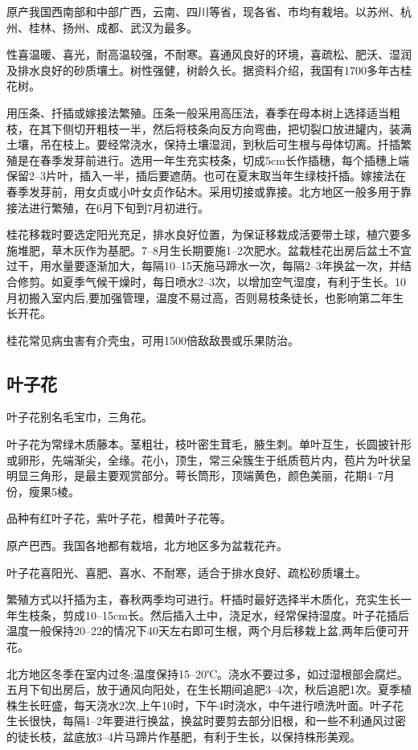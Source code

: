 \documentclass{ctexbook}
\begin{document}
原产我国西南部和中部广西，云南、四川等省，现各省、市均有栽培。以苏州、杭州、桂林、扬州、成都、武汉为最多。

性喜温暖、喜光，耐高温较强，不耐寒。喜通风良好的环境，喜疏松、肥沃、湿润及排水良好的砂质壤土。树性强健，树龄久长。据资料介绍，我国有1700多年古桂花树。

用压条、扦插或嫁接法繁殖。压条一般采用高压法，春季在母本树上选择适当粗枝，在其下侧切开粗枝一半，然后将枝条向反方向弯曲，把切裂口放进罐内，装满土壤，吊在枝上。要经常浇水，保持土壤湿润，到秋后可生根与母体切离。扦插繁殖是在春季发芽前进行。选用一年生充实枝条，切成5cm长作插穗，每个插穗上端保留2--3片叶，插入一半，插后要遮荫。也可在夏末取当年生绿枝扦插。嫁接法在春季发芽前，用女贞或小叶女贞作砧木。采用切接或靠接。北方地区一般多用于靠接法进行繁殖，在6月下旬到7月初进行。

桂花移栽时要选定阳光充足，排水良好位置，为保证移栽成活要带土球，植穴要多施堆肥，草木灰作为基肥。7--8月生长期要施1--2次肥水。盆栽桂花出房后盆土不宜过干，用水量要逐渐加大，每隔10--15天施马蹄水一次，每隔2--3年换盆一次，并结合修剪。如夏季气候干燥时，每日喷水2--3次，以增加空气湿度，有利于生长。10月初搬入室内后,要加强管理，温度不易过高，否则易枝条徒长，也影响第二年生长开花。

桂花常见病虫害有介壳虫，可用1500倍敌敌畏或乐果防治。
\subsection{叶子花}
叶子花别名毛宝巾，三角花。

叶子花为常绿木质藤本。茎粗壮，枝叶密生茸毛，腋生刺。单叶互生，长圆披针形或卵形，先端渐尖，全缘。花小，顶生，常三朵簇生于纸质苞片内，苞片为叶状呈明显三角形，是最主要观赏部分。萼长筒形，顶端黄色，颜色美丽，花期4--7月份，瘦果5棱。

品种有红叶子花，紫叶子花，橙黄叶子花等。

原产巴西。我国各地都有栽培，北方地区多为盆栽花卉。

叶子花喜阳光、喜肥、喜水、不耐寒，适合于排水良好、疏松砂质壤土。

繁殖方式以扦插为主，春秋两季均可进行。杆插时最好选择半木质化，充实生长一年生枝条，剪成10--15cm长。然后插入土中，浇足水，经常保持湿度。叶子花插后温度一般保持20--22的情况下40天左右即可生根，两个月后移栽上盆,两年后便可开花。

北方地区冬季在室内过冬;温度保持15--20℃。浇水不要过多，如过湿根部会腐烂。五月下旬出房后，放于通风向阳处，在生长期间追肥3--4次，秋后追肥1次。夏季植株生长旺盛，每天浇水2次,上午10时，下午4时浇水，中午进行喷洗叶面。叶子花生长很快，每隔1--2年要进行换盆，换盆时要剪去部分旧根，和一些不利通风过密的徒长枝，盆底放3--4片马蹄片作基肥，有利于生长，以保持株形美观。
\end{document}
